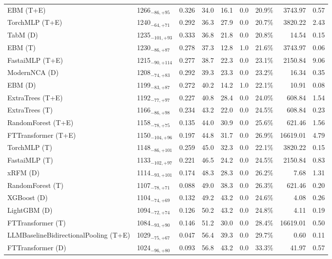 \begin{tabular}{llcccccrr}
EBM (T+E) & 1266${}_{-86,+95}$ & 0.326 & 34.0 & 16.1 & 0.0 & 20.9\% & 3743.97 & 0.57 \\
TorchMLP (T+E) & 1240${}_{-64,+71}$ & 0.292 & 36.3 & 27.9 & 0.0 & 20.7\% & 3820.22 & 2.43 \\
TabM (D) & 1235${}_{-101,+93}$ & 0.333 & 36.8 & 21.8 & 0.0 & 20.8\% & 14.54 & 0.15 \\
EBM (T) & 1230${}_{-86,+87}$ & 0.278 & 37.3 & 12.8 & 1.0 & 21.6\% & 3743.97 & 0.06 \\
FastaiMLP (T+E) & 1215${}_{-90,+114}$ & 0.277 & 38.7 & 22.3 & 0.0 & 23.1\% & 2150.84 & 9.06 \\
ModernNCA (D) & 1208${}_{-74,+83}$ & 0.292 & 39.3 & 23.3 & 0.0 & 23.2\% & 16.34 & 0.35 \\
EBM (D) & 1199${}_{-83,+87}$ & 0.272 & 40.2 & 14.2 & 1.0 & 22.1\% & 10.91 & 0.08 \\
ExtraTrees (T+E) & 1192${}_{-77,+97}$ & 0.227 & 40.8 & 28.4 & 0.0 & 24.0\% & 608.84 & 1.54 \\
ExtraTrees (T) & 1166${}_{-86,+98}$ & 0.234 & 43.2 & 22.0 & 0.0 & 24.5\% & 608.84 & 0.23 \\
RandomForest (T+E) & 1158${}_{-78,+75}$ & 0.135 & 44.0 & 30.9 & 0.0 & 25.6\% & 621.46 & 1.56 \\
FTTransformer (T+E) & 1150${}_{-104,+96}$ & 0.197 & 44.8 & 31.7 & 0.0 & 26.9\% & 16619.01 & 4.79 \\
TorchMLP (T) & 1148${}_{-86,+101}$ & 0.259 & 45.0 & 32.3 & 0.0 & 22.1\% & 3820.22 & 0.15 \\
FastaiMLP (T) & 1133${}_{-102,+97}$ & 0.221 & 46.5 & 24.2 & 0.0 & 24.5\% & 2150.84 & 0.83 \\
xRFM (D) & 1114${}_{-93,+101}$ & 0.174 & 48.3 & 28.3 & 0.0 & 26.2\% & 7.68 & 1.31 \\
RandomForest (T) & 1107${}_{-78,+71}$ & 0.088 & 49.0 & 38.3 & 0.0 & 26.3\% & 621.46 & 0.20 \\
XGBoost (D) & 1104${}_{-74,+69}$ & 0.132 & 49.2 & 43.2 & 0.0 & 24.6\% & 4.08 & 0.26 \\
LightGBM (D) & 1094${}_{-72,+74}$ & 0.126 & 50.2 & 43.2 & 0.0 & 24.8\% & 4.11 & 0.19 \\
FTTransformer (T) & 1084${}_{-93,+90}$ & 0.146 & 51.2 & 30.0 & 0.0 & 28.4\% & 16619.01 & 0.50 \\
LLMBaselineBidirectionalPooling (T+E) & 1029${}_{-75,+67}$ & 0.047 & 56.4 & 39.3 & 0.0 & 29.7\% & 0.60 & 0.11 \\
FTTransformer (D) & 1024${}_{-96,+80}$ & 0.093 & 56.8 & 43.2 & 0.0 & 33.3\% & 41.97 & 0.57 \\

\end{tabular}
